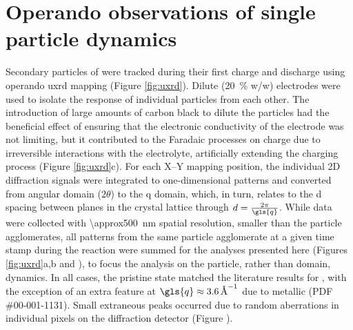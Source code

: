 \documentclass{article}
\begin{document}
\section{Operando observations of single particle dynamics}


Secondary particles of \nca{} were tracked during their first charge
and discharge using operando \gls{uxrd} mapping (Figure
\ref{fig:uxrd}). Dilute (\SI{20}{\percent} w/w) \nca{} electrodes were
used to isolate the response of individual particles from each
other. The introduction of large amounts of carbon black to dilute the
particles had the beneficial effect of ensuring that the electronic
conductivity of the electrode was not limiting, but it contributed to
the Faradaic processes on charge due to irreversible interactions with
the electrolyte\cite{kostecki2014}, artificially extending the
charging process (Figure \ref{fig:uxrd}c). For each X--Y mapping
position, the individual 2D diffraction signals were integrated to
one-dimensional patterns and converted from angular domain ($2\theta$)
to the \gls{q} domain, which, in turn, relates to the d spacing
between planes in the crystal lattice through
$d=\frac{2\pi}{\gls{q}}$. While data were collected with
\SI{\approx500}{\nano\meter} spatial resolution, smaller than the
particle agglomerates, all patterns from the same particle agglomerate
at a given time stamp during the reaction were summed for the analyses
presented here (Figures \ref{fig:uxrd}a,b and
), to focus the analysis on the particle,
rather than domain, dynamics. In all cases, the pristine state matched
the literature results for \nca{} \cite{novak2015}, with the exception
of an extra feature at $\gls{q}\approx\SI{3.6}{\per\angstrom}$ due to
metallic  (PDF \#00-001-1131). Small extraneous peaks occurred
due to random aberrations in individual pixels on the diffraction
detector (Figure ).
\end{document}
